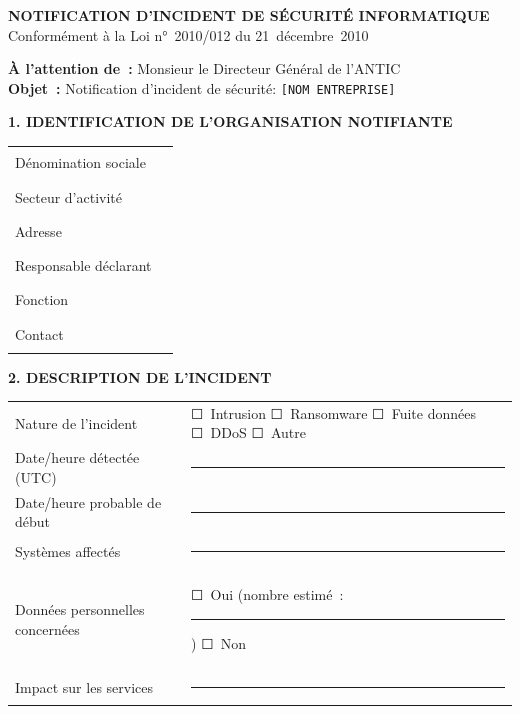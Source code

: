 \medskip
\begin{center}
{\bfseries\color{CouleurPrimaire}
NOTIFICATION D'INCIDENT DE SÉCURITÉ INFORMATIQUE}\\[0.3ex]
{\small Conformément à la Loi n°~2010/012 du 21~décembre~2010}
\end{center}

\bigskip

\textbf{À l'attention de~:} Monsieur le Directeur Général de l'ANTIC\\
\textbf{Objet~:} Notification d'incident de sécurité: \texttt{[NOM ENTREPRISE]}

\bigskip

\textbf{1. IDENTIFICATION DE L'ORGANISATION NOTIFIANTE}
\vspace{0.5ex}

\begin{table}[H]\centering\small{}
\begin{tabular}{p{5cm}p{8.5cm}}
\toprule
Dénomination sociale & \rule{8.5cm}{0.4pt} \\
Secteur d'activité & \rule{8.5cm}{0.4pt} \\
Adresse & \rule{8.5cm}{0.4pt} \\
Responsable déclarant & \rule{8.5cm}{0.4pt} \\
Fonction & \rule{8.5cm}{0.4pt} \\
Contact & \rule{8.5cm}{0.4pt} \\
\bottomrule
\end{tabular}
\end{table}

\textbf{2. DESCRIPTION DE L'INCIDENT}

\begin{table}[H]\centering\small{}
\begin{tabular}{p{5cm}p{8.5cm}}
\toprule
Nature de l'incident & ☐~Intrusion \quad ☐~Ransomware \quad ☐~Fuite données \quad ☐~DDoS \quad ☐~Autre \\
Date/heure détectée (UTC) & \rule{8.5cm}{0.4pt} \\
Date/heure probable de début & \rule{8.5cm}{0.4pt} \\
Systèmes affectés & \rule{8.5cm}{0.4pt} \\
Données personnelles concernées & ☐~Oui (nombre estimé~: \rule{3cm}{0.4pt}) \quad ☐~Non \\
Impact sur les services & \rule{8.5cm}{0.4pt} \\
\bottomrule
\end{tabular}
\end{table}

